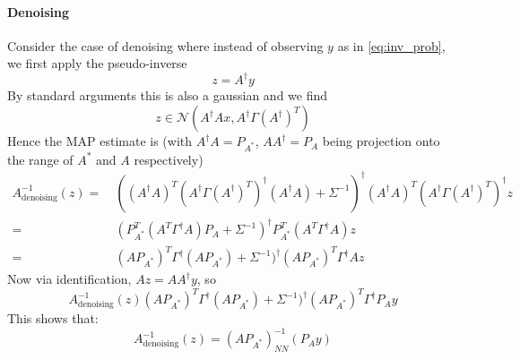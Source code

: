 \documentclass[a4paper,10pt]{article}
\begin{document}
	\paragraph{Denoising}
	
	Consider the case of denoising where instead of observing $y$ as in \ref{eq:inv_prob}, we first apply the pseudo-inverse
	\[
		z = A^\dagger y
	\]
	By standard arguments this is also a gaussian and we find
	\[
		z \in \mathcal{N}(A^\dagger A x, A^\dagger \Gamma ({A^\dagger})^T)
	\]
	Hence the MAP estimate is (with $A^\dagger A = P_{A^*}$, $A A^\dagger = P_{A}$ being projection onto the range of $A^*$ and $A$ respectively)
	\begin{align*}
		A^{-1}_{\text{denoising}}(z) 
		=&\
		((A^\dagger A)^T (A^\dagger \Gamma ({A^\dagger})^T)^{\dagger} (A^\dagger A) + \Sigma^{-1})^{\dagger} (A^\dagger A)^T (A^\dagger \Gamma ({A^\dagger})^T)^{\dagger} z
		\\=&\
		(P_{A^*}^T (A^T \Gamma^{\dagger} A) P_{A} + \Sigma^{-1})^{\dagger} P_{A^*}^T (A^T \Gamma^\dagger A) z
		\\=&\
		(A P_{A^*})^T \Gamma^{\dagger} (A P_{A^*}) + \Sigma^{-1})^{\dagger} (A P_{A^*})^T \Gamma^\dagger A z
	\end{align*}
	Now via identification, $Az = A A^\dagger y$, so
	\[
		A^{-1}_{\text{denoising}}(z) 
		(A P_{A^*})^T \Gamma^{\dagger} (A P_{A^*}) + \Sigma^{-1})^{\dagger} (A P_{A^*})^T \Gamma^\dagger P_A y
	\]
	This shows that:
	\[
		A^{-1}_{\text{denoising}}(z) = (A P_{A^*})^{-1}_{NN}(P_A y)
	\]

\printbibliography%
	
\end{document}
